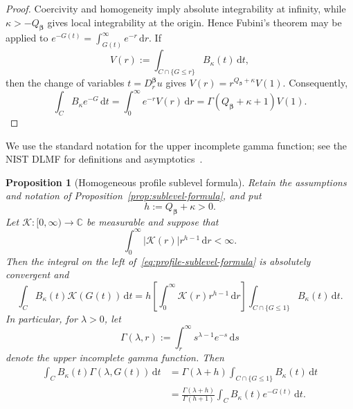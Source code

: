 \documentclass[11pt]{amsart}
\numberwithin{equation}{section}
\newtheorem{proposition}[theorem]{Proposition}
\theoremstyle{definition}
\theoremstyle{remark}
\newcommand{\C}{\mathbb{C}}
\newcommand{\dd}{\,\mathrm{d}}
\begin{document}
\begin{proof}
Coercivity and homogeneity imply absolute integrability at infinity, while
$\kappa>-Q_{\bm\beta}$ gives local integrability at the origin.  Hence Fubini's
theorem may be applied to
$e^{-G(t)}=\int_{G(t)}^\infty e^{-r}\dd r$.  If
\[
 V(r):=\int_{C\cap\{G\le r\}}B_\kappa(t)\dd t,
\]
then the change of variables $t=D_r^{\bm\beta}u$ gives
$V(r)=r^{Q_{\bm\beta}+\kappa}V(1)$.  Consequently,
\[
 \int_C B_\kappa e^{-G}\dd t
 =\int_0^\infty e^{-r}V(r)\dd r
 =\Gamma(Q_{\bm\beta}+\kappa+1)V(1).
\]
\end{proof}

We use the standard notation for the upper incomplete gamma function; see the
NIST DLMF for definitions and asymptotics~\cite{DLMF}.

\begin{proposition}[Homogeneous profile sublevel formula]
\label{prop:profile-sublevel-formula}
Retain the assumptions and notation of
Proposition~\ref{prop:sublevel-formula}, and put
\[
 h:=Q_{\bm\beta}+\kappa>0.
\]
Let $\mathcal K:[0,\infty)\to\C$ be measurable and suppose that
\begin{equation}\label{eq:profile-mellin-integrability}
 \int_0^\infty |\mathcal K(r)|r^{h-1}\dd r<\infty.
\end{equation}
Then the integral on the left of~\eqref{eq:profile-sublevel-formula}
is absolutely convergent and
\begin{equation}\label{eq:profile-sublevel-formula}
 \int_C B_\kappa(t)\mathcal K(G(t))\dd t
 =h\left[\int_0^\infty \mathcal K(r)r^{h-1}\dd r\right]
  \int_{C\cap\{G\le1\}}B_\kappa(t)\dd t.
\end{equation}
In particular, for $\lambda>0$, let
\begin{equation}\label{eq:upper-incomplete-gamma}
 \Gamma(\lambda,r):=\int_r^\infty s^{\lambda-1}e^{-s}\dd s
\end{equation}
denote the upper incomplete gamma function.  Then
\begin{align}
 \int_C B_\kappa(t)\Gamma(\lambda,G(t))\dd t
 &=\Gamma(\lambda+h)
   \int_{C\cap\{G\le1\}}B_\kappa(t)\dd t
   \label{eq:gamma-profile-sublevel}\\
 &=\frac{\Gamma(\lambda+h)}{\Gamma(h+1)}
   \int_C B_\kappa(t)e^{-G(t)}\dd t.
   \label{eq:gamma-profile-exponential}
\end{align}
\end{proposition}
\end{document}
